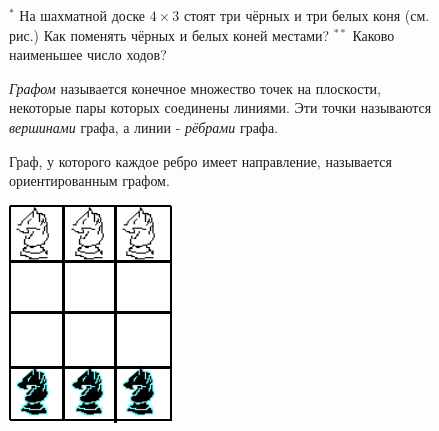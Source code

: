 {\setlength{\intextsep}{2pt}
\begin{figure}[h]
\begin{minipage}{0.8\linewidth}\setlength{\parindent}{1.5em}
\begin{thm} $^*$
    На шахматной доске $4 \times 3$ стоят три чёрных и три белых коня (см. рис.) Как поменять чёрных и белых коней местами? $^{**}$ Каково наименьшее число ходов?
\end{thm}
\begin{dfn} \textit{Графом} называется конечное множество точек на плоскости, некоторые пары которых соединены линиями. Эти точки называются \textit{вершинами} графа, а линии - \textit{рёбрами} графа.
\end{dfn}
\par
\begin{dfn} Граф, у которого каждое ребро имеет направление, называется ориентированным графом.
\end{dfn}
\end{minipage}
\hfill
\begin{minipage}{0.17\linewidth}
    \includegraphics[width=0.9\columnwidth]{img/knight2.png}
\end{minipage}
\end{figure}}

